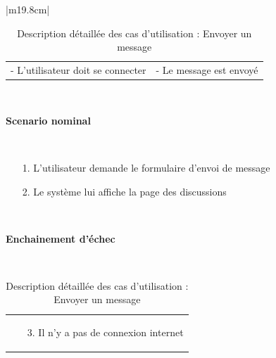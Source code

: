\begin{table}[h]
\begin{tabular}{|m{19.8cm}|}
		\hline
		\begin{tabular}{m{9.3cm}|m{9.3cm}}
			- L’utilisateur doit se connecter \newline
			& 
			\centering - Le message est envoyé
			\\[0ex]
		\end{tabular}
		\\
		\hline
		\begin{center}
			\textbf{Scenario nominal}
		\end{center}
		\\
		[-4ex]
		\hline
		\begin{enumerate}
			\item [1.] L’utilisateur demande le formulaire d’envoi de message
			\item [2.] Le système lui affiche la page des discussions
		\end{enumerate}
		\\
		[-4ex]
		\hline	
		\begin{center}
			\textbf{Enchainement d’échec }
		\end{center}
		\\ 
		[-4ex]
		\hline
		\begin{tabular}{m{17.5cm}}
			\begin{enumerate}
				\item [3.] Il n’y a pas de connexion internet
				
			\end{enumerate}
			\\[-4ex]
		\end{tabular}
		\\
		\hline	
		
	\end{tabular}
	\vspace*{1.5cm}
	\centering \caption{Description détaillée des cas d'utilisation : Envoyer un message}
	\label{4.1}
\end{table}

